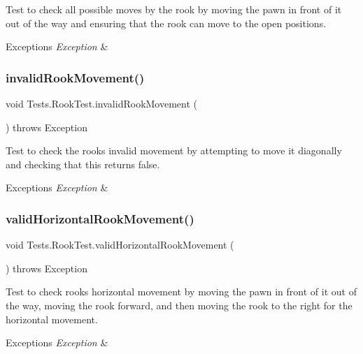 Test to check all possible moves by the rook by moving the pawn in front of it out of the way and ensuring that the rook can move to the open positions. 
\begin{DoxyExceptions}{Exceptions}
{\em Exception} & \\
\hline
\end{DoxyExceptions}
\hypertarget{class_tests_1_1_rook_test_a3ecbdd2925b2497d7238d3d5057d527e}{}\label{class_tests_1_1_rook_test_a3ecbdd2925b2497d7238d3d5057d527e} 
\subsubsection{\texorpdfstring{invalid\+Rook\+Movement()}{invalidRookMovement()}}
{\footnotesize\ttfamily void Tests.\+Rook\+Test.\+invalid\+Rook\+Movement (\begin{DoxyParamCaption}{ }\end{DoxyParamCaption}) throws Exception}

Test to check the rook\textquotesingle{}s invalid movement by attempting to move it diagonally and checking that this returns false. 
\begin{DoxyExceptions}{Exceptions}
{\em Exception} & \\
\hline
\end{DoxyExceptions}
\hypertarget{class_tests_1_1_rook_test_a668f3fea9c6f61ff4ef09cb0da938810}{}\label{class_tests_1_1_rook_test_a668f3fea9c6f61ff4ef09cb0da938810} 
\subsubsection{\texorpdfstring{valid\+Horizontal\+Rook\+Movement()}{validHorizontalRookMovement()}}
{\footnotesize\ttfamily void Tests.\+Rook\+Test.\+valid\+Horizontal\+Rook\+Movement (\begin{DoxyParamCaption}{ }\end{DoxyParamCaption}) throws Exception}

Test to check rook\textquotesingle{}s horizontal movement by moving the pawn in front of it out of the way, moving the rook forward, and then moving the rook to the right for the horizontal movement. 
\begin{DoxyExceptions}{Exceptions}
{\em Exception} & \\
\hline
\end{DoxyExceptions}
\hypertarget{class_tests_1_1_rook_test_a3e0f7b9a6c9660eb2a75405197d261d8}{}\label{class_tests_1_1_rook_test_a3e0f7b9a6c9660eb2a75405197d261d8} 
